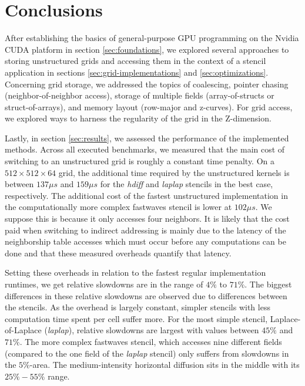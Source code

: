 \chapter{Conclusions}

After establishing the basics of general-purpose GPU programming on the Nvidia CUDA platform in section \ref{sec:foundations}, we explored several approaches to storing unstructured grids and accessing them in the context of a stencil application in sections \ref{sec:grid-implementations} and \ref{sec:optimizations}. Concerning grid storage, we addressed the topics of coalescing, pointer chasing (neighbor-of-neighbor access), storage of multiple fields (array-of-structs or struct-of-arrays), and memory layout (row-major and z-curves). For grid access, we explored ways to harness the regularity of the grid in the Z-dimension. 

Lastly, in section \ref{sec:results}, we assessed the performance of the implemented methods. Across all executed benchmarks, we measured that the main cost of switching to an unstructured grid is roughly a constant time penalty. On a $512\times 512\times 64$ grid, the additional time required by the unstructured kernels is between $137 \mu s$ and $159 \mu s$ for the \emph{hdiff} and \emph{laplap} stencils in the best case, respectively. The additional cost of the fastest unstructured implementation in the computationally more complex fastwaves stencil is lower at $102 \mu s$. We suppose this is because it only accesses four neighbors. It is likely that the cost paid when switching to indirect addressing is mainly due to the latency of the neighborship table accesses which must occur before any computations can be done and that these measured overheads quantify that latency.

Setting these overheads in relation to the fastest regular implementation runtimes, we get relative slowdowns are in the range of $4\%$ to $71\%$. The biggest differences in these relative slowdowns are observed due to differences between the stencils. As the overhead is largely constant, simpler stencils with less computation time spent per cell suffer more. For the most simple stencil, Laplace-of-Laplace (\emph{laplap}), relative slowdowns are largest with values between $45\%$ and $71\%$. The more complex fastwaves stencil, which accesses nine different fields (compared to the one field of the \emph{laplap} stencil) only suffers from slowdowns in the $5\%$-area. The medium-intensity horizontal diffusion sits in the middle with its $25\% - 55\%$ range. 

